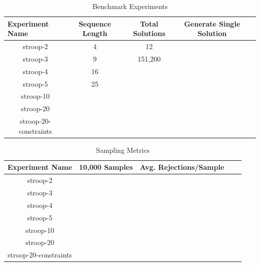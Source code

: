 \begin{table}
  \centering
  \caption{Benchmark Experiments}
\begin{tabular}{|c|c|c|c|c|}
\hline
\multicolumn{1}{|l|}{Experiment Name} & Sequence Length & Total Solutions & Generate Single Solution  \\ \hline
stroop-2                              & 4               & 12              &                           \\ \hline
stroop-3                              & 9               & 151,200         &                           \\ \hline
stroop-4                              & 16              &                 &                           \\ \hline
stroop-5                              & 25              &                 &                           \\ \hline
stroop-10                             &                 &                 &                           \\ \hline
stroop-20                             &                 &                 &                           \\ \hline
stroop-20-constraints                 &                 &                 &                           \\ \hline
\end{tabular}
\label{tab:benchmark_experiments}
\end{table}

\begin{table}
  \centering
  \caption{Sampling Metrics}
\begin{tabular}{|c|c|c|c|c|}
\hline
\multicolumn{1}{|l|}{Experiment Name} & 10,000 Samples & Avg. Rejections/Sample  \\ \hline
stroop-2                              &                &                         \\ \hline
stroop-3                              &                &                         \\ \hline
stroop-4                              &                &                         \\ \hline
stroop-5                              &                &                         \\ \hline
stroop-10                             &                &                         \\ \hline
stroop-20                             &                &                         \\ \hline
stroop-20-constraints                 &                &                         \\ \hline
\end{tabular}
\label{tab:sampling_metrics}
\end{table}


